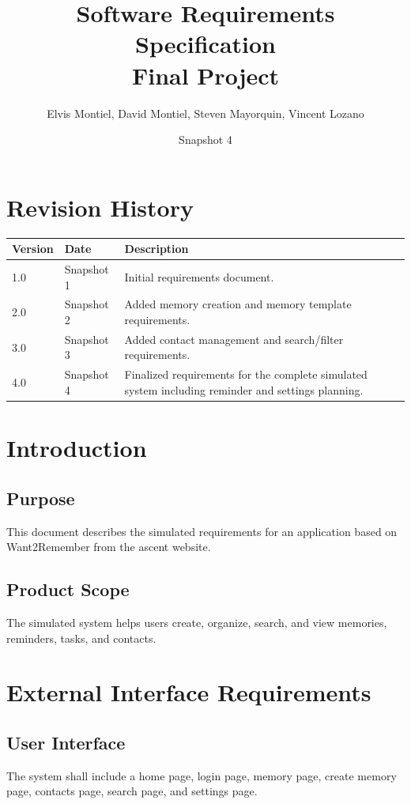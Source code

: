 \documentclass{article}
\title{Software Requirements Specification\\Final Project}
\author{Elvis Montiel, David Montiel, Steven Mayorquin, Vincent Lozano}
\date{Snapshot 4}
\begin{document}
\maketitle
\tableofcontents
\newpage

\section{Revision History}
\begin{longtable}{|p{2cm}|p{3cm}|p{8cm}|}
\hline
Version & Date & Description \\ \hline
1.0 & Snapshot 1 & Initial requirements document. \\ \hline
2.0 & Snapshot 2 & Added memory creation and memory template requirements. \\ \hline
3.0 & Snapshot 3 & Added contact management and search/filter requirements. \\ \hline
4.0 & Snapshot 4 & Finalized requirements for the complete simulated system including reminder and settings planning. \\ \hline
\end{longtable}

\section{Introduction}
\subsection{Purpose}
This document describes the simulated requirements for an application based on Want2Remember from the ascent website.

\subsection{Product Scope}
The simulated system helps users create, organize, search, and view memories, reminders, tasks, and contacts.

\section{External Interface Requirements}
\subsection{User Interface}
The system shall include a home page, login page, memory page, create memory page, contacts page, search page, and settings page.
\end{document}

